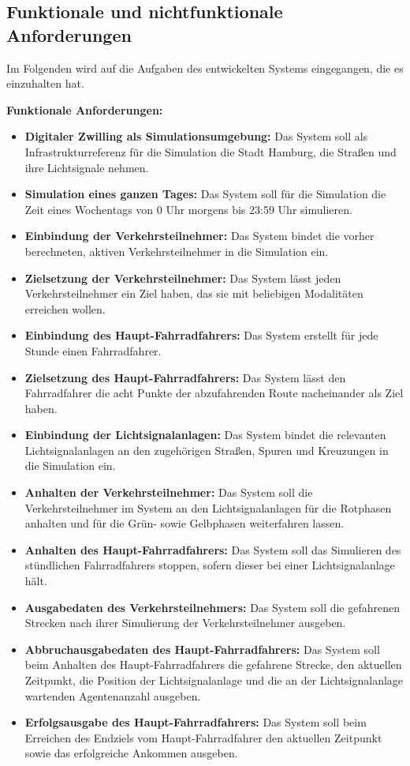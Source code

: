 %

\subsection{Funktionale und nichtfunktionale Anforderungen}\label{subsec:requirements}

Im Folgenden wird auf die Aufgaben des entwickelten Systems eingegangen, die es einzuhalten hat.

\textbf{Funktionale Anforderungen:}

\begin{itemize}
    \item \textbf{Digitaler Zwilling als Simulationsumgebung:} Das System soll als Infrastrukturreferenz für die Simulation die Stadt Hamburg, die Straßen und ihre Lichtsignale nehmen.
    \item \textbf{Simulation eines ganzen Tages:} Das System soll für die Simulation die Zeit eines Wochentags von 0 Uhr morgens bis 23:59 Uhr simulieren.
    \item \textbf{Einbindung der Verkehrsteilnehmer:} Das System bindet die vorher berechneten, aktiven Verkehrsteilnehmer in die Simulation ein.
    \item \textbf{Zielsetzung der Verkehrsteilnehmer:} Das System lässt jeden Verkehrsteilnehmer ein Ziel haben, das sie mit beliebigen Modalitäten erreichen wollen.
    \item \textbf{Einbindung des Haupt-Fahrradfahrers:} Das System erstellt für jede Stunde einen Fahrradfahrer.
    \item \textbf{Zielsetzung des Haupt-Fahrradfahrers:} Das System lässt den Fahrradfahrer die acht Punkte der abzufahrenden Route nacheinander als Ziel haben.
    \item \textbf{Einbindung der Lichtsignalanlagen:} Das System bindet die relevanten Lichtsignalanlagen an den zugehörigen Straßen, Spuren und Kreuzungen in die Simulation ein.
    \item \textbf{Anhalten der Verkehrsteilnehmer:} Das System soll die Verkehrsteilnehmer im System an den Lichtsignalanlagen für die Rotphasen anhalten und für die Grün- sowie Gelbphasen weiterfahren lassen.
    \item \textbf{Anhalten des Haupt-Fahrradfahrers:} Das System soll das Simulieren des stündlichen Fahrradfahrers stoppen, sofern dieser bei einer Lichtsignalanlage hält.
    \item \textbf{Ausgabedaten des Verkehrsteilnehmers:} Das System soll die gefahrenen Strecken nach ihrer Simulierung der Verkehrsteilnehmer ausgeben.
    \item \textbf{Abbruchausgabedaten des Haupt-Fahrradfahrers:} Das System soll beim Anhalten des Haupt-Fahrradfahrers die gefahrene Strecke, den aktuellen Zeitpunkt, die Position der Lichtsignalanlage und die an der Lichtsignalanlage wartenden Agentenanzahl ausgeben.
    \item \textbf{Erfolgsausgabe des Haupt-Fahrradfahrers:} Das System soll beim Erreichen des Endziels vom Haupt-Fahrradfahrer den aktuellen Zeitpunkt sowie das erfolgreiche Ankommen ausgeben.
\end{itemize}

